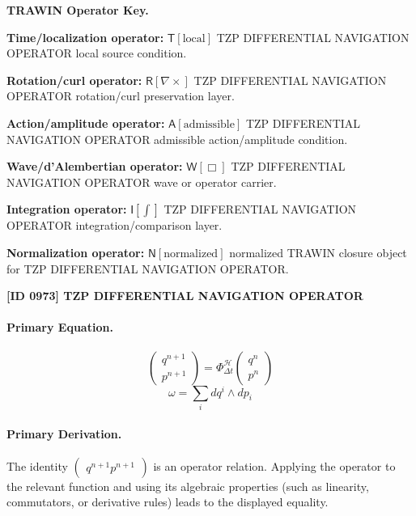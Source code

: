 \par\vspace{0.45\baselineskip}
\noindent\begin{minipage}[t]{\linewidth}
\begingroup
\small
\raggedright
\textbf{TRAWIN Operator Key.}\par
\noindent\textbf{Time/localization operator:} $\mathsf{T}\!\left[\mathrm{local}\right]$ TZP DIFFERENTIAL NAVIGATION OPERATOR local source condition.\par
\noindent\textbf{Rotation/curl operator:} $\mathsf{R}\!\left[\nabla\times\right]$ TZP DIFFERENTIAL NAVIGATION OPERATOR rotation/curl preservation layer.\par
\noindent\textbf{Action/amplitude operator:} $\mathsf{A}\!\left[\mathrm{admissible}\right]$ TZP DIFFERENTIAL NAVIGATION OPERATOR admissible action/amplitude condition.\par
\noindent\textbf{Wave/d'Alembertian operator:} $\mathsf{W}\!\left[\Box\right]$ TZP DIFFERENTIAL NAVIGATION OPERATOR wave or operator carrier.\par
\noindent\textbf{Integration operator:} $\mathsf{I}\!\left[\int\right]$ TZP DIFFERENTIAL NAVIGATION OPERATOR integration/comparison layer.\par
\noindent\textbf{Normalization operator:} $\mathsf{N}\!\left[\mathrm{normalized}\right]$ normalized TRAWIN closure object for TZP DIFFERENTIAL NAVIGATION OPERATOR.\par
\endgroup
\end{minipage}

\clearpage
\noindent\textbf{[ID 0973] TZP DIFFERENTIAL NAVIGATION OPERATOR}\par
\vspace{0.35em}
\paragraph{Primary Equation.}
\[
\begin{pmatrix}q^{n+1}\\ p^{n+1}\end{pmatrix}
=\Phi_{\Delta t}^{\mathcal{H}}\begin{pmatrix}q^{n}\\ p^{n}\end{pmatrix}
\]
\[
\omega = \sum_i dq^i \wedge dp_i
\]

\paragraph{Primary Derivation.}
The identity \( \begin{pmatrix}q^{n+1} p^{n+1}\end{pmatrix} \) is an operator relation. Applying the operator to the relevant function and using its algebraic properties (such as linearity, commutators, or derivative rules) leads to the displayed equality.
